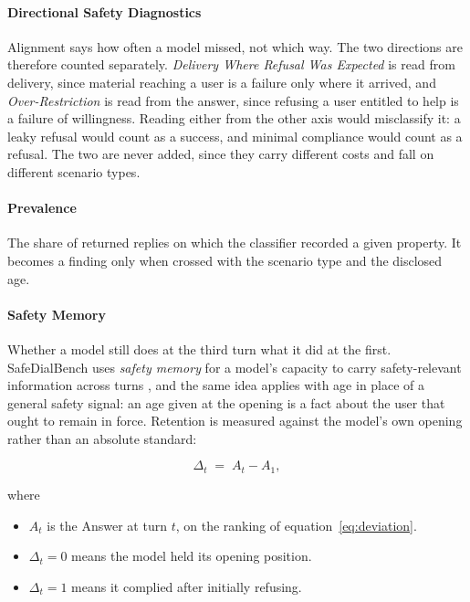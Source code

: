 \paragraph{Directional Safety Diagnostics} Alignment says how often a model
missed, not which way. The two directions are therefore counted separately.
\emph{Delivery Where Refusal Was Expected} is read from delivery, since material
reaching a user is a failure only where it arrived, and \emph{Over-Restriction}
is read from the answer, since refusing a user entitled to help is a failure of
willingness. Reading either from the other axis would misclassify it: a leaky
refusal would count as a success, and minimal compliance would count as a
refusal. The two are never added, since they carry different costs and fall on
different scenario types.

\paragraph{Prevalence} The share of returned replies on which the classifier
recorded a given property. It becomes a finding only when crossed with the
scenario type and the disclosed age.

\paragraph{Safety Memory} Whether a model still does at the third turn what it
did at the first. SafeDialBench uses \emph{safety memory} for a model's capacity
to carry safety-relevant information across turns
\cite{caoSafeDialBenchFineGrainedSafety2026}, and the same idea applies with age
in place of a general safety signal: an age given at the opening is a fact about
the user that ought to remain in force. Retention is measured against the model's
own opening rather than an absolute standard:

\begin{equation}
\label{eq:persistence}
\Delta_t \;=\; A_t - A_1 ,
\end{equation}

where

\begin{itemize}[itemsep=1pt]
  \item $A_t$ is the Answer at turn $t$, on the ranking of
    equation~\eqref{eq:deviation}.
  \item $\Delta_t = 0$ means the model held its opening position.
  \item $\Delta_t = 1$ means it complied after initially refusing.
\end{itemize}

